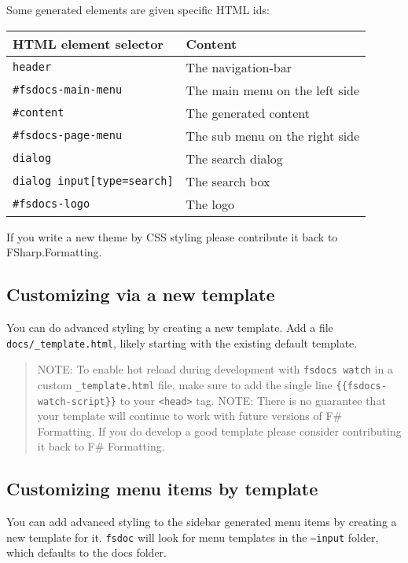 \documentclass{article}
\begin{document}
Some generated elements are given specific HTML ids:
\begin{tabular}{|l|l|}\hline
\textbf{HTML element selector} & \textbf{Content}\\ \hline\hline
\texttt{header} & The navigation-bar\\ \hline
\texttt{\#fsdocs-main-menu} & The main menu on the left side\\ \hline
\texttt{\#content} & The generated content\\ \hline
\texttt{\#fsdocs-page-menu} & The sub menu on the right side\\ \hline
\texttt{dialog} & The search dialog\\ \hline
\texttt{dialog input[type=search]} & The search box\\ \hline
\texttt{\#fsdocs-logo} & The logo\\ \hline
\end{tabular}



If you write a new theme by CSS styling please contribute it back to FSharp.Formatting.
\subsection*{Customizing via a new template}



You can do advanced styling by creating a new template. Add a file \texttt{docs/\_template.html}, likely starting
with the existing default template.
\begin{quote}


NOTE: To enable hot reload during development with \texttt{fsdocs watch} in a custom \texttt{\_template.html} file,
make sure to add the single line \texttt{\{\{fsdocs-watch-script\}\}}  to your \texttt{<head>} tag.
NOTE: There is no guarantee that your template will continue to work with future versions of F\# Formatting.
If you do develop a good template please consider contributing it back to F\# Formatting.
\end{quote}

\subsection*{Customizing menu items by template}



You can add advanced styling to the sidebar generated menu items by creating a new template for it.
\texttt{fsdoc} will look for menu templates in the \texttt{--input} folder, which defaults to the docs folder.
\end{document}

